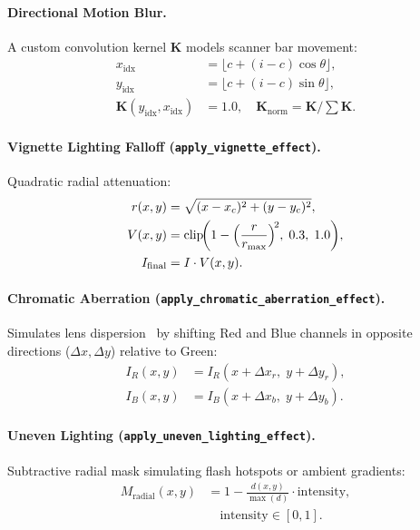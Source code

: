 \documentclass[11pt,twocolumn]{article}
\begin{document}
\paragraph{Directional Motion Blur.} A custom convolution kernel $\mathbf{K}$ models scanner bar movement:
\begin{align}
  x_{\text{idx}} &= \lfloor c + (i-c)\cos\theta\rfloor, \label{eq:motion_idx_x}\\
  y_{\text{idx}} &= \lfloor c + (i-c)\sin\theta\rfloor, \label{eq:motion_idx_y}\\
  \mathbf{K}(y_{\text{idx}}, x_{\text{idx}}) &= 1.0,\quad \mathbf{K}_{\text{norm}} = \mathbf{K}\Big/\!\sum\mathbf{K}. \label{eq:motion_kernel}
\end{align}

\paragraph{Vignette Lighting Falloff (\texttt{apply\_vignette\_effect}).} Quadratic radial attenuation:
\begin{align}
  r(x,y) &= \sqrt{(x-x_c)^2+(y-y_c)^2}, \label{eq:vig_r}\\
  V(x,y) &= \text{clip}\!\biggl(1 - \Bigl(\frac{r}{r_{\max}}\Bigr)^{\!2},\; 0.3,\; 1.0\biggr), \label{eq:vig_V}\\
  I_{\text{final}} &= I \cdot V(x,y). \label{eq:vig_final}
\end{align}

\paragraph{Chromatic Aberration (\texttt{apply\_chromatic\_aberration\_effect}).} Simulates lens dispersion~\cite{boult1992correcting} by shifting Red and Blue channels in opposite directions ($\Delta x, \Delta y$) relative to Green:
\begin{align}
  I_R(x,y) &= I_R(x+\Delta x_r,\; y+\Delta y_r), \label{eq:chrom_r}\\
  I_B(x,y) &= I_B(x+\Delta x_b,\; y+\Delta y_b). \label{eq:chrom_b}
\end{align}

\paragraph{Uneven Lighting (\texttt{apply\_uneven\_lighting\_effect}).} Subtractive radial mask simulating flash hotspots or ambient gradients:
\begin{align}\label{eq:uneven_light}
  M_{\text{radial}}(x,y) &= 1 - \frac{d(x,y)}{\max(d)}\cdot\text{intensity}, \nonumber\\
  &\quad \text{intensity} \in [0,1].
\end{align}
\end{document}
